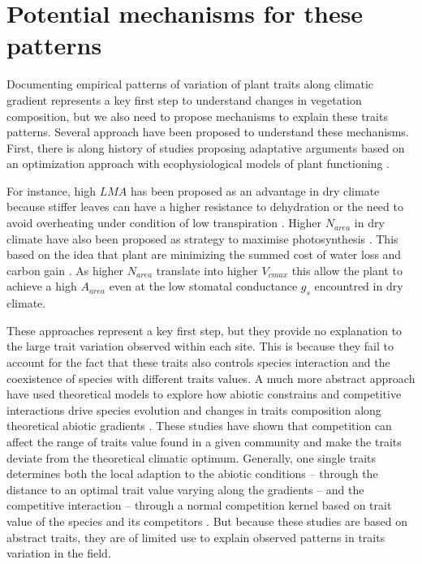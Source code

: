 \documentclass[a4paper,11pt]{article}
\begin{document}
\clearpage

\section{Potential mechanisms for these patterns}

Documenting empirical patterns of variation of plant traits along
climatic gradient represents a key first step to understand changes in
vegetation composition, but we also need to propose mechanisms to
explain these traits patterns. Several approach have been proposed to
understand these mechanisms. First, there is along history of studies
proposing adaptative arguments based on an optimization approach with
ecophysiological models of plant functioning \citep{Makela-2002}.

For instance, high $LMA$ has been proposed as an advantage in dry climate because
stiffer leaves can have a higher resistance to dehydration
\citep{Wright-2002a,Wright-2002b} or the need to avoid overheating
under condition of low transpiration \citep{Leigh-2012}. Higher
$N_{area}$ in dry climate have also been proposed as strategy to
maximise photosynthesis \citep{Wright-2003}. This
based on the idea that plant are minimizing the summed cost of water
loss and carbon gain
\citep{Medlyn-2002,Wright-2003,Prentice-2014,Lu-2016,Wang-2017,Dong-2017}. As
higher $N_{area}$ translate into higher $V_{cmax}$ this allow the
plant to achieve a high $A_{area}$ even at the low stomatal conductance
$g_s$ encountred in dry climate.

These approaches represent a key first step, but
they provide no explanation to the large trait variation observed
within each site. This is because they fail to account for the fact that
these traits also controls species interaction and the coexistence of
species with different traits values. A much more abstract approach
have used theoretical models to explore how abiotic constrains and competitive interactions drive species evolution and
changes in traits composition along theoretical abiotic gradients
\citep{Case-2000,Doebeli-2003,Goldberg-2006,Leimar-2008}. These
studies have shown that competition can affect the range of traits
value found in a given community and make the traits deviate from the
theoretical climatic optimum.  Generally, one single traits determines
both the local adaption to the abiotic conditions -- through the
distance to an optimal trait value varying along the gradients -- and
the competitive interaction -- through a normal competition kernel
based on trait value of the species and its competitors
\citep[see][]{Case-2000}. But because these studies are based on abstract traits, they are of limited use to explain observed patterns in traits variation in the field.
\end{document}
